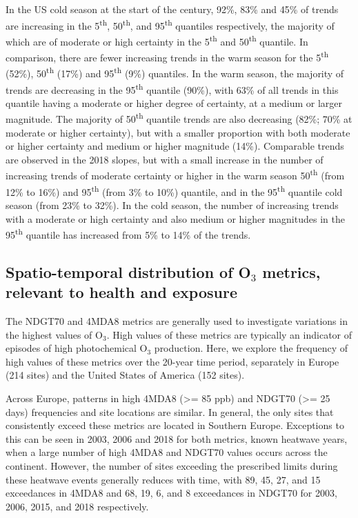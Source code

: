 \documentclass[journal abbreviation, manuscript]{copernicus}
\begin{document}
In the US cold season at the start of the century, 92\%, 83\% and 45\% of trends are increasing in the 5\textsuperscript{th}, 50\textsuperscript{th}, and 95\textsuperscript{th} quantiles respectively, the majority of which are of moderate or high certainty in the 5\textsuperscript{th} and 50\textsuperscript{th} quantile. In comparison, there are fewer increasing trends in the warm season for the 5\textsuperscript{th} (52\%), 50\textsuperscript{th} (17\%) and 95\textsuperscript{th} (9\%) quantiles. In the warm season, the majority of trends are decreasing in the 95\textsuperscript{th} quantile (90\%), with 63\% of all trends in this quantile having a moderate or higher degree of certainty, at a medium or larger magnitude. The majority of 50\textsuperscript{th} quantile trends are also decreasing (82\%; 70\% at moderate or higher certainty), but with a smaller proportion with both moderate or higher certainty and medium or higher magnitude (14\%). Comparable trends are observed in the 2018 slopes, but with a small increase in the number of increasing trends of moderate certainty or higher in the warm season 50\textsuperscript{th} (from 12\% to 16\%) and 95\textsuperscript{th} (from 3\% to 10\%) quantile, and in the 95\textsuperscript{th} quantile cold season (from 23\% to 32\%). In the cold season, the number of increasing trends with a moderate or high certainty and also medium or higher magnitudes in the 95\textsuperscript{th} quantile has increased from 5\% to 14\% of the trends.


\subsection{Spatio-temporal distribution of O$_3$ metrics, relevant to health and exposure} \label{sect:metrics_distribution}

The NDGT70 and 4MDA8 metrics are generally used to investigate variations in the highest values of O$_3$. High values of these metrics are typically an indicator of episodes of high photochemical O$_3$ production. Here, we explore the frequency of high values of these metrics over the 20-year time period, separately in Europe (214 sites) and the United States of America (152 sites).

Across Europe, patterns in high 4MDA8 (>= 85 ppb) and NDGT70 (>= 25 days) frequencies and site locations are similar. In general, the only sites that consistently exceed these metrics are located in Southern Europe. Exceptions to this can be seen in 2003, 2006 and 2018 for both metrics, known heatwave years, when a large number of high 4MDA8 and NDGT70 values occurs across the continent. However, the number of sites exceeding the prescribed limits during these heatwave events generally reduces with time, with 89, 45, 27, and 15 exceedances in 4MDA8 and 68, 19, 6, and 8 exceedances in NDGT70 for 2003, 2006, 2015, and 2018 respectively.
\end{document}
